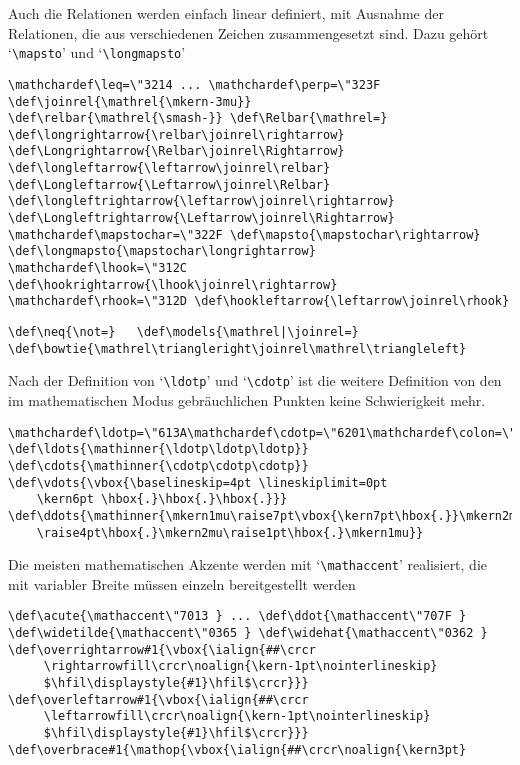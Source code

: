 \begin{appendix}
Auch die Relationen werden einfach linear definiert, mit Ausnahme der
Relationen, die aus verschiedenen Zeichen zusammengesetzt sind. Dazu
geh\"ort `\verb|\mapsto|' und `\verb|\longmapsto|'
\begin{verbatim}
\mathchardef\leq=\"3214 ... \mathchardef\perp=\"323F
\def\joinrel{\mathrel{\mkern-3mu}}
\def\relbar{\mathrel{\smash-}} \def\Relbar{\mathrel=}
\def\longrightarrow{\relbar\joinrel\rightarrow}
\def\Longrightarrow{\Relbar\joinrel\Rightarrow}
\def\longleftarrow{\leftarrow\joinrel\relbar}
\def\Longleftarrow{\Leftarrow\joinrel\Relbar}
\def\longleftrightarrow{\leftarrow\joinrel\rightarrow}
\def\Longleftrightarrow{\Leftarrow\joinrel\Rightarrow}
\mathchardef\mapstochar=\"322F \def\mapsto{\mapstochar\rightarrow}
\def\longmapsto{\mapstochar\longrightarrow}
\mathchardef\lhook=\"312C \def\hookrightarrow{\lhook\joinrel\rightarrow}
\mathchardef\rhook=\"312D \def\hookleftarrow{\leftarrow\joinrel\rhook}
\end{verbatim}
\begin{verbatim}
\def\neq{\not=}   \def\models{\mathrel|\joinrel=}
\def\bowtie{\mathrel\triangleright\joinrel\mathrel\triangleleft}
\end{verbatim}
Nach der Definition von `\verb|\ldotp|' und `\verb|\cdotp|' ist die
weitere Definition von den im mathematischen Modus gebr\"auchlichen
Punkten keine Schwierigkeit mehr.
\begin{verbatim}
\mathchardef\ldotp=\"613A\mathchardef\cdotp=\"6201\mathchardef\colon=\"603A
\def\ldots{\mathinner{\ldotp\ldotp\ldotp}}
\def\cdots{\mathinner{\cdotp\cdotp\cdotp}}
\def\vdots{\vbox{\baselineskip=4pt \lineskiplimit=0pt
    \kern6pt \hbox{.}\hbox{.}\hbox{.}}}
\def\ddots{\mathinner{\mkern1mu\raise7pt\vbox{\kern7pt\hbox{.}}\mkern2mu
    \raise4pt\hbox{.}\mkern2mu\raise1pt\hbox{.}\mkern1mu}}
\end{verbatim}
Die meisten mathematischen 
Akzente werden mit `\verb|\mathaccent|'
realisiert, die mit variabler Breite m\"ussen einzeln bereitgestellt
werden
\begin{verbatim}
\def\acute{\mathaccent\"7013 } ... \def\ddot{\mathaccent\"707F }
\def\widetilde{\mathaccent\"0365 } \def\widehat{\mathaccent\"0362 }
\def\overrightarrow#1{\vbox{\ialign{##\crcr
     \rightarrowfill\crcr\noalign{\kern-1pt\nointerlineskip}
     $\hfil\displaystyle{#1}\hfil$\crcr}}}
\def\overleftarrow#1{\vbox{\ialign{##\crcr
     \leftarrowfill\crcr\noalign{\kern-1pt\nointerlineskip}
     $\hfil\displaystyle{#1}\hfil$\crcr}}}
\def\overbrace#1{\mathop{\vbox{\ialign{##\crcr\noalign{\kern3pt}

\end{verbatim}
\end{appendix}
